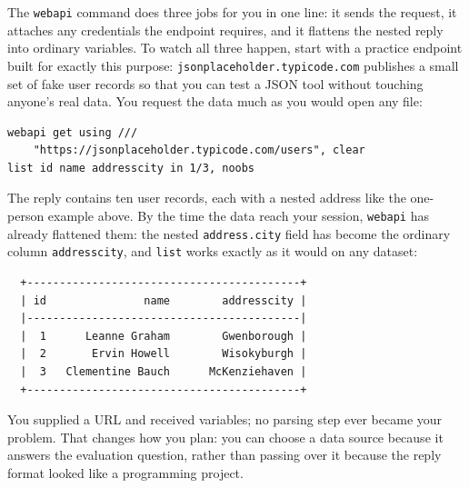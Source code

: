 \documentclass[
    a4paper,
    fontsize=10pt,
    twoside=true,
    numbers=noenddot,
]{kaobook}
\begin{document}
The \texttt{webapi} command does three jobs for you in one line: it sends the request, it attaches any credentials the endpoint requires, and it flattens the nested reply into ordinary variables. To watch all three happen, start with a practice endpoint built for exactly this purpose: \texttt{jsonplaceholder.typicode.com} publishes a small set of fake user records so that you can test a JSON tool without touching anyone's real data. You request the data much as you would open any file:
\par
{\footnotesize
\begin{verbatim}
webapi get using ///
    "https://jsonplaceholder.typicode.com/users", clear
list id name addresscity in 1/3, noobs
\end{verbatim}
}
The reply contains ten user records, each with a nested address like the one-person example above. By the time the data reach your session, \texttt{webapi} has already flattened them: the nested \texttt{address.city} field has become the ordinary column \texttt{addresscity}, and \texttt{list} works exactly as it would on any dataset:
\par
{\footnotesize
\begin{verbatim}
  +------------------------------------------+
  | id               name        addresscity |
  |------------------------------------------|
  |  1      Leanne Graham        Gwenborough |
  |  2       Ervin Howell        Wisokyburgh |
  |  3   Clementine Bauch      McKenziehaven |
  +------------------------------------------+
\end{verbatim}
}
You supplied a URL and received variables; no parsing step ever became your problem. That changes how you plan: you can choose a data source because it answers the evaluation question, rather than passing over it because the reply format looked like a programming project.
\end{document}
